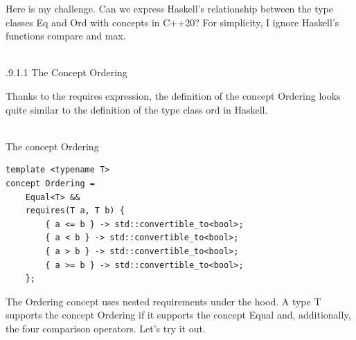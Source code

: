 Here is my challenge. Can we express Haskell’s relationship between the type classes Eq and Ord with concepts in C++20? For simplicity, I ignore Haskell’s functions compare and max.

\hspace*{\fill} \\ %
.9.1.1\hspace{0.2cm} The Concept Ordering

Thanks to the requires expression, the definition of the concept Ordering looks quite similar to the definition of the type class ord in Haskell.

\hspace*{\fill} \\ %
\noindent
The concept Ordering
\begin{lstlisting}[style=styleCXX]
template <typename T>
concept Ordering =
	Equal<T> &&
	requires(T a, T b) {
		{ a <= b } -> std::convertible_to<bool>;
		{ a < b } -> std::convertible_to<bool>;
		{ a > b } -> std::convertible_to<bool>;
		{ a >= b } -> std::convertible_to<bool>;
	};
\end{lstlisting}

The Ordering concept uses nested requirements under the hood. A type T supports the concept Ordering if it supports the concept Equal and, additionally, the four comparison operators. Let’s try it out.

